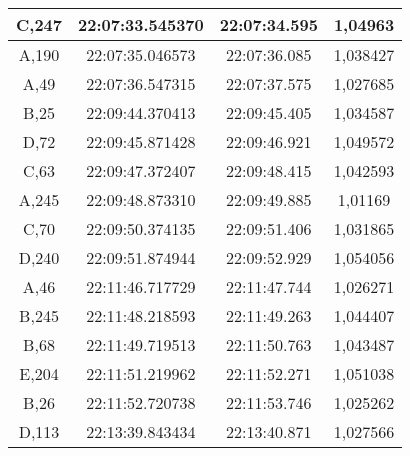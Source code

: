 \begin{table}[H]
\begin{tabular}{|ccc|c|}
    \multicolumn{1}{|c|}{C,247} & \multicolumn{1}{c|}{22:07:33.545370} & 22:07:34.595       & 1,04963                          \\ \hline
    \multicolumn{1}{|c|}{A,190} & \multicolumn{1}{c|}{22:07:35.046573} & 22:07:36.085       & 1,038427                         \\ \hline
    \multicolumn{1}{|c|}{A,49}  & \multicolumn{1}{c|}{22:07:36.547315} & 22:07:37.575       & 1,027685                         \\ \hline
    \multicolumn{1}{|c|}{B,25}  & \multicolumn{1}{c|}{22:09:44.370413} & 22:09:45.405       & 1,034587                         \\ \hline
    \multicolumn{1}{|c|}{D,72}  & \multicolumn{1}{c|}{22:09:45.871428} & 22:09:46.921       & 1,049572                         \\ \hline
    \multicolumn{1}{|c|}{C,63}  & \multicolumn{1}{c|}{22:09:47.372407} & 22:09:48.415       & 1,042593                         \\ \hline
    \multicolumn{1}{|c|}{A,245} & \multicolumn{1}{c|}{22:09:48.873310} & 22:09:49.885       & 1,01169                          \\ \hline
    \multicolumn{1}{|c|}{C,70}  & \multicolumn{1}{c|}{22:09:50.374135} & 22:09:51.406       & 1,031865                         \\ \hline
    \multicolumn{1}{|c|}{D,240} & \multicolumn{1}{c|}{22:09:51.874944} & 22:09:52.929       & 1,054056                         \\ \hline
    \multicolumn{1}{|c|}{A,46}  & \multicolumn{1}{c|}{22:11:46.717729} & 22:11:47.744       & 1,026271                         \\ \hline
    \multicolumn{1}{|c|}{B,245} & \multicolumn{1}{c|}{22:11:48.218593} & 22:11:49.263       & 1,044407                         \\ \hline
    \multicolumn{1}{|c|}{B,68}  & \multicolumn{1}{c|}{22:11:49.719513} & 22:11:50.763       & 1,043487                         \\ \hline
    \multicolumn{1}{|c|}{E,204} & \multicolumn{1}{c|}{22:11:51.219962} & 22:11:52.271       & 1,051038                         \\ \hline
    \multicolumn{1}{|c|}{B,26}  & \multicolumn{1}{c|}{22:11:52.720738} & 22:11:53.746       & 1,025262                         \\ \hline
    \multicolumn{1}{|c|}{D,113} & \multicolumn{1}{c|}{22:13:39.843434} & 22:13:40.871       & 1,027566                         \\ \hline

\end{tabular}
\end{table}
